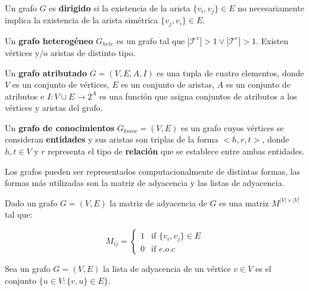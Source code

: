\begin{definition}
    Un grafo $G$ es \textbf{dirigido} si la existencia de la arista $\{v_i, v_j\} \in E$ no
    necesariamente implica la existencia de la arista sim\'etrica $\{v_j, v_i\} \in E$.
\end{definition}

\begin{definition}
    Un \textbf{grafo heterog\'eneo} $G_{hete}$ es un grafo tal 
    que $|\mathcal{T}^v| > 1 \vee |\mathcal{T}^e| > 1$. Existen v\'ertices y/o aristas
    de distinto tipo.
\end{definition}

\begin{definition}
    Un \textbf{grafo atributado} $G = (V,E,A,I)$ es una tupla de cuatro
    elementos, donde $V$ es un conjunto
    de v\'ertices, $E$ es un conjunto de aristas, $A$ es un
    conjunto de atributos e $I : V \cup E \to 2^A$ es una
    funci\'on que asigna conjuntos de atributos a los v\'ertices
    y aristas del grafo.
\end{definition}

\begin{definition}
    Un \textbf{grafo de conocimientos} $G_{know} = (V,E)$ es un grafo cuyos v\'ertices
    se consideran \textbf{entidades} y sus aristas son triplas de la forma $<h,r,t>$,
    donde $h, t \in V$ y $r$ representa el tipo de \textbf{relaci\'on} que se establece entre
    ambas entidades. 
\end{definition}



Los grafos pueden ser representados computacionalmente de distintas formas, las formas
m\'as utilizadas son la matriz de adyacencia y las listas de adyacencia.


\begin{definition}
    Dado un grafo $G = (V,E)$ la matriz de adyacencia de $G$ es una matriz
    $M^{|V|\times|V|}$ tal que:
    
    $$
            M_{ij} =
        \left\{
            \begin{array}{ll}
                1  & \mbox{if } \{v_i, v_j\} \in E \\
                0 & \mbox{if } e.o.c
            \end{array}
        \right.
    $$

\end{definition}


\begin{definition}
    Sea un grafo $G = (V,E)$ la lista de adyacencia de un v\'ertice $v \in V$ es el conjunto
    $\{ u \in V : \{v,u\} \in E \}$.
\end{definition}


